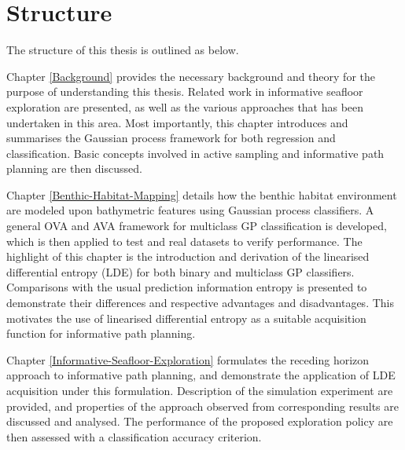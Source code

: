 	\newpage
	\section{Structure}
	
		The structure of this thesis is outlined as below.
		
		
		Chapter \ref{Background} provides the necessary background and theory for the purpose of understanding this thesis. Related work in informative seafloor exploration are presented, as well as the various approaches that has been undertaken in this area. Most importantly, this chapter introduces and summarises the Gaussian process framework for both regression and classification. Basic concepts involved in active sampling and informative path planning are then discussed. 
		
		Chapter \ref{Benthic-Habitat-Mapping} details how the benthic habitat environment are modeled upon bathymetric features using Gaussian process classifiers. A general OVA and AVA framework for multiclass GP classification is developed, which is then applied to test and real datasets to verify performance. The highlight of this chapter is the introduction and derivation of the linearised differential entropy (LDE) for both binary and multiclass GP classifiers. Comparisons with the usual prediction information entropy is presented to demonstrate their differences and respective advantages and disadvantages. This motivates the use of linearised differential entropy as a suitable acquisition function for informative path planning.
		
		Chapter \ref{Informative-Seafloor-Exploration} formulates the receding horizon approach to informative path planning, and demonstrate the application of LDE acquisition under this formulation. Description of the simulation experiment are provided, and properties of the approach observed from corresponding results are discussed and analysed. The performance of the proposed exploration policy are then assessed with a classification accuracy criterion.
		
